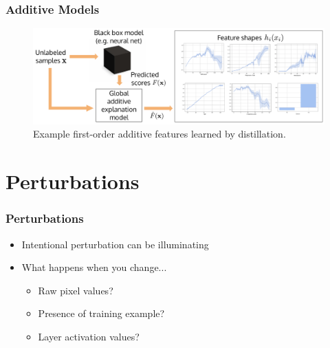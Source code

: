 \documentclass[10pt,mathserif]{beamer}
\begin{document}
\begin{frame}
  \frametitle{Additive Models}
 \begin{figure}[ht]
   \centering
   \includegraphics[width=0.7\paperwidth]{figure/additive}
   \caption{Example first-order additive features learned by
     distillation. \label{fig:additive} }
 \end{figure}
\end{frame}

\section{Perturbations}

\begin{frame}
  \frametitle{Perturbations}
  \begin{itemize}
  \item Intentional perturbation can be illuminating
  \item What happens when you change...
    \begin{itemize}
    \item Raw pixel values?
    \item Presence of training example?
    \item Layer activation values?
    \end{itemize}
  \end{itemize} 
\end{frame}
\end{document}
